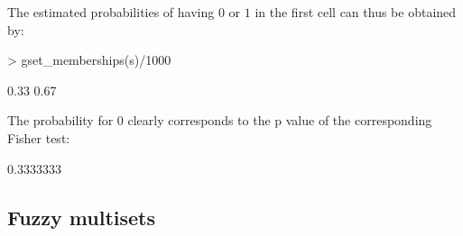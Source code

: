 \documentclass[article]{jss}
\begin{document}
The estimated probabilities of having $0$ or $1$ in the first cell can thus
be obtained by:
\begin{Schunk}
\begin{Sinput}
> gset_memberships(s)/1000
\end{Sinput}
\begin{Soutput}
[1] 0.33 0.67
\end{Soutput}
\end{Schunk}
The probability for $0$
clearly corresponds to the p value of the corresponding Fisher test:
\begin{Schunk}
\begin{Soutput}
[1] 0.3333333
\end{Soutput}
\end{Schunk}

\subsection{Fuzzy multisets}
\end{document}
